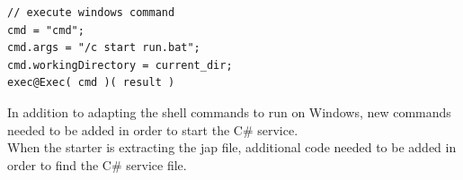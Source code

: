 \documentclass[12pt,a4paper]{article}
\begin{document}
\begin{lstlisting}[caption={Linux \& Windows starter commands},label={lst:linuxWindowsStartCommand}]
// execute windows command
cmd = "cmd";                                                                                                                                                                                             
cmd.args = "/c start run.bat";                                                                                                                                                                           
cmd.workingDirectory = current_dir;                                                                                                                                                                      
exec@Exec( cmd )( result )
\end{lstlisting}

In addition to adapting the shell commands to run on Windows, new commands needed to be added in order to start the C\# service. \\
When the starter is extracting the jap file, additional code needed to be added in order to find the C\# service file.
\end{document}
